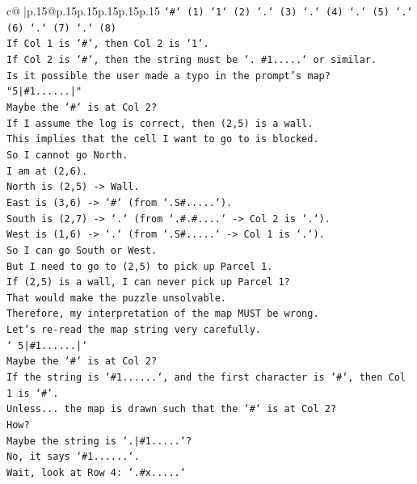 \documentclass{article}
\begin{document}
{\begin{supertabular}{c@{$\;$}|p{.15\linewidth}@{}p{.15\linewidth}p{.15\linewidth}p{.15\linewidth}p{.15\linewidth}p{.15\linewidth}}
{{{\texttt{`\#` (1) `1` (2) `.` (3) `.` (4) `.` (5) `.` (6) `.` (7) `.` (8)} \\
\texttt{If Col 1 is `\#`, then Col 2 is `1`.} \\
\texttt{If Col 2 is `\#`, then the string must be `. \#1.....` or similar.} \\
\texttt{Is it possible the user made a typo in the prompt's map?} \\
\texttt{"5|\#1......|"} \\
\texttt{Maybe the `\#` is at Col 2?} \\
\texttt{If I assume the log is correct, then (2,5) is a wall.} \\
\texttt{This implies that the cell I want to go to is blocked.} \\
\texttt{So I cannot go North.} \\
\texttt{I am at (2,6).} \\
\texttt{North is (2,5) {-}> Wall.} \\
\texttt{East is (3,6) {-}> `\#` (from `.S\#.....`).} \\
\texttt{South is (2,7) {-}> `.` (from `.\#.\#....` {-}> Col 2 is `.`).} \\
\texttt{West is (1,6) {-}> `.` (from `.S\#.....` {-}> Col 1 is `.`).} \\
\texttt{So I can go South or West.} \\
\texttt{But I need to go to (2,5) to pick up Parcel 1.} \\
\texttt{If (2,5) is a wall, I can never pick up Parcel 1?} \\
\texttt{That would make the puzzle unsolvable.} \\
\texttt{Therefore, my interpretation of the map MUST be wrong.} \\
\texttt{Let's re{-}read the map string very carefully.} \\
\texttt{` 5|\#1......|`} \\
\texttt{Maybe the `\#` is at Col 2?} \\
\texttt{If the string is `\#1......`, and the first character is `\#`, then Col 1 is `\#`.} \\
\texttt{Unless... the map is drawn such that the `\#` is at Col 2?} \\
\texttt{How?} \\
\texttt{Maybe the string is `.|\#1.....`?} \\
\texttt{No, it says `\#1......`.} \\
\texttt{Wait, look at Row 4: `.\#x.....`} \\
}}}
\end{supertabular}}
\end{document}
